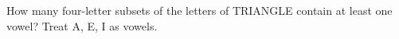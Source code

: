 How many four-letter subsets of the letters of TRIANGLE contain at least one vowel? Treat A, E, I as vowels.
